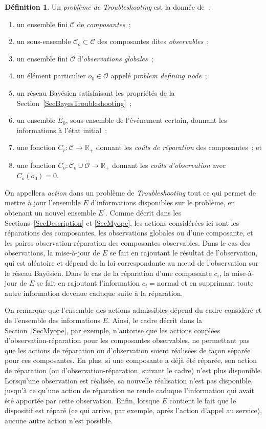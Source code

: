 \documentclass[a4paper,11pt]{article}
\theoremstyle{plain}
\theoremstyle{definition}
\newtheorem*{defi}{Définition}
\begin{document}
\begin{defi}
Un \emph{problème de Troubleshooting} est la donnée de~:
\begin{enumerate}
\item un ensemble fini $\mathcal C$ de \emph{composantes}~;
\item un sous-ensemble $\mathcal C_o \subset \mathcal C$ des composantes dites \emph{observables}~;
\item un ensemble fini $\mathcal O$ d'\emph{observations globales}~;
\item un élément particulier $o_0 \in \mathcal O$ appelé \emph{problem defining node}~;
\item\label{Defi-Bayes} un réseau Bayésien satisfaisant les propriétés de la Section~\ref{SecBayesTroubleshooting}~;
\item un ensemble $E_0$, sous-ensemble de l'événement certain, donnant les informations à l'état initial~;
\item\label{Defi-CoutReparation} une fonction $C_r: \mathcal C \to \mathbb R_+$ donnant les \emph{coûts de réparation} des composantes~; et
\item\label{Defi-CoutObservation} une fonction $C_o: \mathcal C_o \cup \mathcal O \to \mathbb R_+$ donnant les \emph{coûts d'observation} avec $C_o(o_0) = 0$.
\end{enumerate}
\end{defi}

On appellera \emph{action} dans un problème de \emph{Troubleshooting} tout ce qui permet de mettre à jour l'ensemble $E$ d'informations disponibles sur le problème, en obtenant un nouvel ensemble $E^\prime$. Comme décrit dans les Sections~\ref{SecDescription} et \ref{SecMyope}, les actions considérées ici sont les réparations des composantes, les observations globales ou d'une composante, et les paires observation-réparation des composantes observables. Dans le cas des observations, la mise-à-jour de $E$ se fait en rajoutant le résultat de l'observation, qui est aléatoire et dépend de la loi correspondante au nœud de l'observation sur le réseau Bayésien. Dans le cas de la réparation d'une composante $c_i$, la mise-à-jour de $E$ se fait en rajoutant l'information $c_i = \text{normal}$ et en supprimant toute autre information devenue caduque suite à la réparation.

On remarque que l'ensemble des actions admissibles dépend du cadre considéré et de l'ensemble des informations $E$. Ainsi, le cadre décrit dans la Section~\ref{SecMyope}, par exemple, n'autorise que les actions couplées d'observation-réparation pour les composantes observables, ne permettant pas que les actions de réparation ou d'observation soient réalisées de façon séparée pour ces composantes. En plus, si une composante a déjà été réparée, son action de réparation (ou d'observation-réparation, suivant le cadre) n'est plus disponible. Lorsqu'une observation est réalisée, sa nouvelle réalisation n'est pas disponible, jusqu'à ce qu'une action de réparation ne rende caduque l'information qui avait été apportée par cette observation. Enfin, lorsque $E$ contient le fait que le dispositif est réparé (ce qui arrive, par exemple, après l'action d'appel au service), aucune autre action n'est possible.
\end{document}
